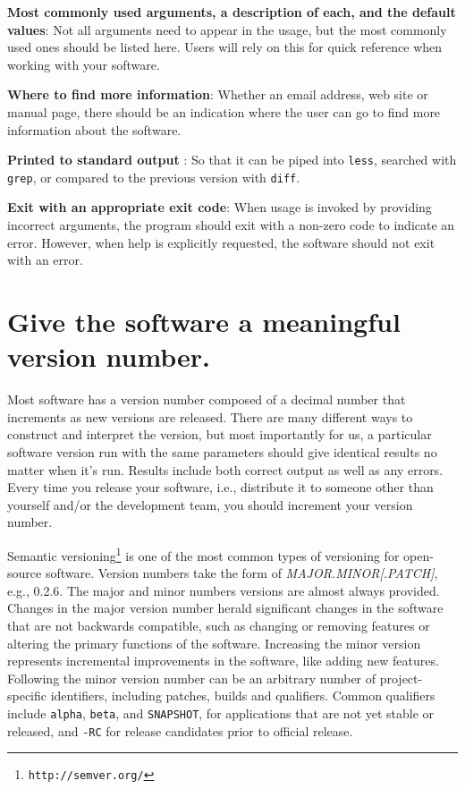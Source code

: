 \documentclass[10pt,letterpaper]{article}
\newcommand{\withurl}[2]{{#1}\footnote{\texttt{#2}}}
\begin{document}
\textbf{Most commonly used arguments, a description of each, and the
default values}: Not all arguments need to appear in the usage, but the most
commonly used ones should be listed here. Users will rely on this for
quick reference when working with your software.

\textbf{Where to find more information}: Whether an email address, web
site or manual page, there should be an indication where the user can go
to find more information about the software.

\textbf{Printed to standard output} : So that it can be piped into
\texttt{less}, searched with \texttt{grep}, or compared to the previous
version with \texttt{diff}.

\textbf{Exit with an appropriate exit code}: When usage is invoked by
providing incorrect arguments, the program should exit with a non-zero
code to indicate an error. However, when help is explicitly requested,
the software should not exit with an error.

\section{Give the software a meaningful version number.}

Most software has a version number composed of a decimal number that
increments as new versions are released. There are many different ways
to construct and interpret the version, but most importantly for us, a
particular software version run with the same parameters should give
identical results no matter when it's run. Results include both correct
output as well as any errors.
Every time you release your software, i.e., distribute it to
someone other than yourself and/or the development team, you should
increment your version number.

\withurl{Semantic versioning}{http://semver.org/} is one of the most common
types of versioning for open-source software. Version numbers take the
form of \emph{MAJOR.MINOR{[}.PATCH{]}}, e.g., 0.2.6. The major and
minor numbers versions are almost always provided. Changes in the major
version number herald significant changes in the software that are not
backwards compatible, such as changing or removing features or altering
the primary functions of the software. Increasing the minor version
represents incremental improvements in the software, like adding new
features. Following the minor version number can be an arbitrary number
of project-specific identifiers, including patches, builds and qualifiers.
Common qualifiers include \texttt{alpha}, \texttt{beta}, and \texttt{SNAPSHOT},
for applications that are
not yet stable or released, and \texttt{-RC} for release candidates prior
to official release.
\end{document}
